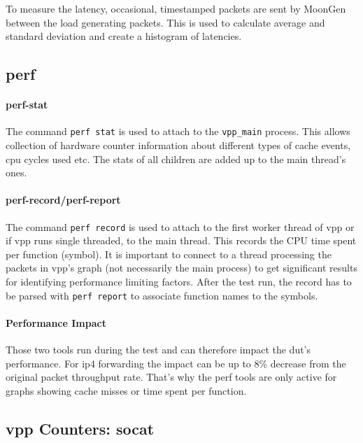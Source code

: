 To measure the latency, occasional, timestamped packets are sent by
MoonGen between the load generating packets. This is used to calculate
average and standard deviation and create a histogram of latencies.


\subsection{\Ac{perf}}

\paragraph{perf-stat} 

The command \lstinline|perf stat| is used to attach to the
\lstinline|vpp_main| process. This allows collection of hardware
counter information about different types of cache events, cpu cycles
used etc. The stats of all children are added up to the main thread's
ones.

\paragraph{perf-record/perf-report}
\label{sec:perf}

The command \lstinline|perf record| is used to attach to the first
worker thread of \Ac{vpp} or if \Ac{vpp} runs single threaded, to the
main thread. This records the CPU time spent per function (symbol). It
is important to connect to a thread processing the packets in
\Ac{vpp}'s graph (not necessarily the main process) to get significant
results for identifying performance limiting factors. After the test
run, the record has to be parsed with \lstinline|perf report| to
associate function names to the symbols.

\paragraph{Performance Impact}

Those two tools run during the test and can therefore impact the
\Ac{dut}'s performance. For \Ac{ip4} forwarding the impact can be up
to 8\% decrease from the original packet throughput rate. That's why
the \Ac{perf} tools are only active for graphs showing cache misses or
time spent per function. 


\subsection{\Ac{vpp} Counters: socat}
\label{sec:vppcounters}

